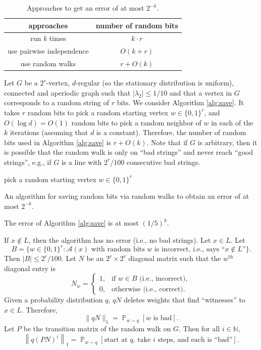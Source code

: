 \documentclass[letterpaper, reqno,11pt]{article}
\newcommand{\NN}{\mathbb{N}}
\newcommand{\PP}{\mathop{{}\mathbb{P}}}
\begin{document}
\begin{table}[h]
  \centering
  \begin{tabular}{c|c}
    approaches & number of random bits \\
    \hline
    \hline
    run $k$ times & $k \cdot r$ \\
    \hline
    use pairwise independence & $O(k + r)$ \\
    \hline
    use random walks & $r + O(k)$
  \end{tabular}
  \caption{Approaches to get an error of at most $2^{-k}$.}
  \label{tab:error}
\end{table}

Let $G$ be a $2^r$-vertex, $d$-regular (so the stationary distribution is uniform), connected and aperiodic graph such that $|\lambda_2| \leq 1/10$ and that a vertex in $G$ corresponds to a random string of $r$ bits. We consider Algorithm \ref{alg:save}. It takes $r$ random bits to pick a random starting vertex $w \in \{ 0, 1 \}^r$, and $O(\log d) = O(1)$ random bits to pick a random neighbor of $w$ in each of the $k$ iterations (assuming that $d$ is a constant). Therefore, the number of random bits used in Algorithm \ref{alg:save} is $r + O(k)$. Note that if $G$ is arbitrary, then it is possible that the random walk is only on ``bad strings'' and never reach ``good strings'', e.g., if $G$ is a line with $2^r/100$ consecutive bad strings.

\begin{algorithm}
  pick a random starting vertex $w \in \{ 0, 1 \}^r$ \\
  \caption{An algorithm for saving random bits via random walks to obtain an error of at most $2^{-k}$.}
  \label{alg:save}
\end{algorithm}

\begin{proposition} \label{prop:error}
  The error of Algorithm \ref{alg:save} is at most $(1/5)^k$.
\end{proposition}

If $x \not \in L$, then the algorithm has no error (i.e., no bad strings). Let $x \in L$. Let
  $$ B = \{ w \in \{ 0, 1 \}^r : \text{$\mathcal A(x)$ with random bits $w$ is incorrect, i.e., says ``$x \not \in L$''} \}. $$
  Then $|B| \leq 2^r/100$. Let $N$ be an $2^r \times 2^r$ diagonal matrix such that the $w^\text{th}$ diagonal entry is
  $$ N_w = \left\{
    \begin{array}{ll}
      1, & \text{if $w \in B$ (i.e., incorrect)}, \\
      0, & \text{otherwise (i.e., correct)}.
    \end{array}
  \right. $$
  Given a probability distribution $q$, $qN$ deletes weights that find ``witnesses'' to $x \in L$. Therefore,
  $$ \| qN \|_1 = \PP_{w \sim q}[\text{$w$ is bad}]. $$
  Let $P$ be the transition matrix of the random walk on $G$. Then for all $i \in \NN$,
  $$ \left\| q(PN)^i \right\|_1 = \PP_{w \sim q}[\text{start at $q$, take $i$ steps, and each is ``bad''}]. $$
\end{document}
